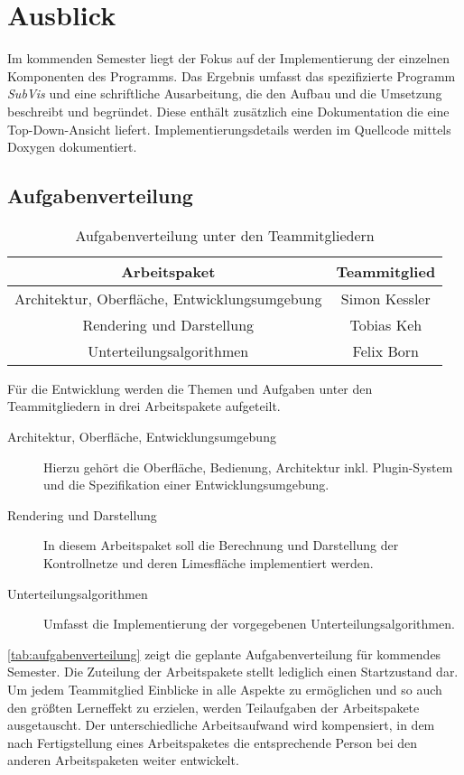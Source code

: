 \section{Ausblick}

Im kommenden Semester liegt der Fokus auf der Implementierung der einzelnen Komponenten des Programms.
Das Ergebnis umfasst das spezifizierte Programm \emph{SubVis} und eine schriftliche Ausarbeitung, die den Aufbau und die Umsetzung beschreibt und begründet.
Diese enthält zusätzlich eine Dokumentation die eine Top-Down-Ansicht liefert. 
Implementierungsdetails werden im Quellcode mittels Doxygen dokumentiert.

\subsection{Aufgabenverteilung}

\begin{table}
\center
\caption{Aufgabenverteilung unter den Teammitgliedern}
\begin{tabular}{c|c}
Arbeitspaket & Teammitglied\\
\hline
Architektur, Oberfläche, Entwicklungsumgebung & Simon Kessler \\
Rendering und Darstellung & Tobias Keh \\
Unterteilungsalgorithmen & Felix Born \\
\end{tabular}
\label{tab:aufgabenverteilung}
\end{table}

Für die Entwicklung werden die Themen und Aufgaben unter den Teammitgliedern in drei Arbeitspakete aufgeteilt.

\begin{description}
\item[Architektur, Oberfläche, Entwicklungsumgebung] Hierzu gehört die Oberfläche, Bedienung, Architektur inkl. Plugin-System und die Spezifikation einer Entwicklungsumgebung.
\item[Rendering und Darstellung] In diesem Arbeitspaket soll die Berechnung und Darstellung der Kontrollnetze und deren Limesfläche implementiert werden.
\item[Unterteilungsalgorithmen] Umfasst die Implementierung der vorgegebenen Unterteilungsalgorithmen.
\end{description}

\autoref{tab:aufgabenverteilung} zeigt die geplante Aufgabenverteilung für kommendes Semester.
Die Zuteilung der Arbeitspakete stellt lediglich einen Startzustand dar. 
Um jedem Teammitglied Einblicke in alle Aspekte zu ermöglichen und so auch den größten Lerneffekt zu erzielen, werden Teilaufgaben der Arbeitspakete ausgetauscht.
Der unterschiedliche Arbeitsaufwand wird kompensiert, in dem nach Fertigstellung eines Arbeitspaketes die entsprechende Person bei den anderen Arbeitspaketen weiter entwickelt.


